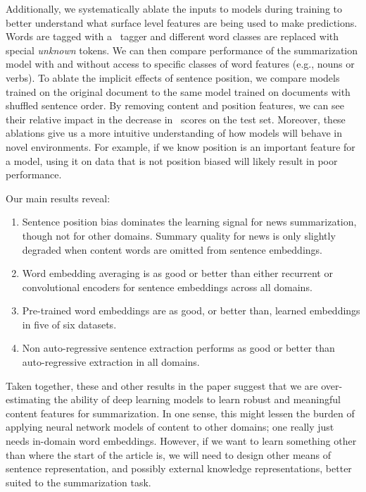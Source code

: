 Additionally, we systematically ablate the inputs to models during training to
better understand what surface level features are being used to make
predictions. Words are tagged with a \partofspeech~tagger and different word
classes are replaced with special \emph{unknown} tokens.  We can then compare
performance of the summarization model with and without access to specific
classes of word features (e.g., nouns or verbs). To ablate the implicit effects
of sentence position, we compare models trained on the original document to the
same model trained on documents with shuffled sentence order.  By removing
content and position features, we can see their relative impact in the decrease
in \rouge~scores on the test set. Moreover, these ablations give us a more
intuitive understanding of how models will behave in novel environments. For
example, if we know position is an important feature for a model, using it on
data that is not position biased will likely result in poor performance.

Our main results  reveal:
\begin{enumerate}
\item Sentence position bias dominates the learning signal for news
    summarization, though not for other domains. Summary quality for news is
    only slightly degraded when content words are omitted from sentence
    embeddings.
\item Word embedding averaging is as good or better than either recurrent
    or convolutional encoders
    for sentence embeddings across all domains.
\item  Pre-trained word embeddings are as good, or better than, learned
    embeddings in five of six datasets.
\item Non auto-regressive sentence extraction performs as good or better than
    auto-regressive extraction in all domains.
\end{enumerate}

Taken together, these and other results in the paper suggest that we are
over-estimating the ability of deep learning models to learn robust and
meaningful content features for summarization. In one sense, this might lessen
the burden of applying neural network models of content to other domains; one
really just needs in-domain word embeddings. However, if we want to learn
something other than where the start of the article is, we will need to design
other means of sentence representation, and possibly external knowledge
representations, better suited to the summarization task.
